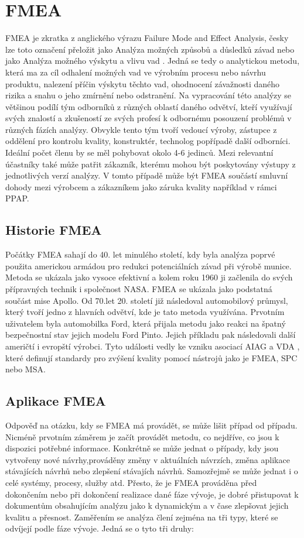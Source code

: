 \chapter{FMEA}
\label{sec:FMEA}
FMEA je zkratka z anglického výrazu Failure Mode and Effect Analysis, česky lze toto označení přeložit jako Analýza možných způsobů a důsledků závad nebo jako Analýza možného výskytu a vlivu vad \cite{preklad}. Jedná se tedy o analytickou metodu, která ma za cíl odhalení možných vad ve výrobním procesu nebo návrhu produktu, nalezení příčin výskytu těchto vad, ohodnocení závažnosti daného rizika a snahu o jeho zmírnění nebo odstranění. Na vypracování této analýzy se většinou podílí tým odborníků z různých oblastí daného odvětví, kteří využívají svých znalostí a zkušeností ze svých profesí k odbornému posouzení problémů v různých fázích analýzy. Obvykle tento tým tvoří vedoucí výroby, zástupce z oddělení pro kontrolu kvality, konstruktér, technolog popřípadě další odborníci. Ideální počet členu by se měl pohybovat okolo 4-6 jedinců. \cite{fmeaTeam} Mezi relevantní účastníky také může patřit zákazník, kterému mohou být poskytovány výstupy z jednotlivých verzí analýzy.  V tomto případě může být FMEA součástí smluvní dohody mezi výrobcem a zákazníkem jako záruka kvality například v rámci PPAP. 

\section{Historie FMEA}
\label{sec:historie}
 Počátky FMEA sahají do 40. let minulého století, kdy byla analýza poprvé použita americkou armádou pro redukci potenciálních závad při výrobě munice. Metoda se ukázala jako vysoce efektivní a kolem roku 1960 ji začlenila do svých přípravných technik i společnost NASA. FMEA se ukázala jako podstatná součást mise Apollo. Od 70.let 20. století již následoval automobilový průmysl, který tvoří jedno z hlavních odvětví, kde je tato metoda využívána. Prvotním uživatelem byla automobilka Ford, která přijala metodu jako reakci na špatný bezpečnostní stav jejich modelu Ford Pinto. Jejich příkladu pak následovali další američtí i evropští výrobci. Tyto události vedly ke vzniku asociací AIAG \cite{aiag} a VDA \cite{vda}, které definují standardy pro zvýšení kvality pomocí nástrojů jako je FMEA, SPC nebo MSA. \cite{historie}

\section{Aplikace FMEA}
 Odpověď na otázku, kdy se FMEA má provádět, se může lišit případ od případu. Nicméně prvotním záměrem je začít provádět metodu, co nejdříve, co jsou k dispozici potřebné informace. Konkrétně se může jednat o případy, kdy jsou vytvořeny nové návrhy,prováděny změny v aktuálních návrzích, změna aplikace stávajících návrhů nebo zlepšení stávajích návrhů. Samozřejmě se může jednat i o celé systémy, procesy, služby atd. Přesto, že je FMEA prováděna před dokončením nebo při dokončení realizace dané fáze vývoje, je dobré přistupovat k dokumentům obsahujícím analýzu jako k dynamickým a v čase zlepšovat jejich kvalitu a přesnost. \cite{fmeatheory} Zaměřením se analýza člení zejména na tři typy, které se odvíjejí podle fáze vývoje. Jedná se o tyto tři druhy: 

